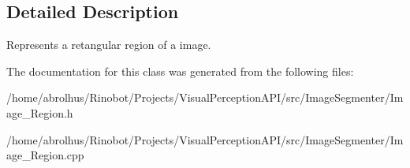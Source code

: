 \subsection{Detailed Description}
Represents a retangular region of a image. 

The documentation for this class was generated from the following files\+:\begin{DoxyCompactItemize}
\item 
/home/abrolhus/\+Rinobot/\+Projects/\+Visual\+Perception\+A\+P\+I/src/\+Image\+Segmenter/Image\+\_\+\+Region.\+h\item 
/home/abrolhus/\+Rinobot/\+Projects/\+Visual\+Perception\+A\+P\+I/src/\+Image\+Segmenter/Image\+\_\+\+Region.\+cpp\end{DoxyCompactItemize}
